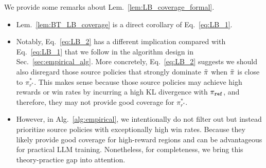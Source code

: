 \begin{remark}\label{remark:LB_coverage}
    We provide some remarks about Lem.~\ref{lem:LB_coverage_formal}.
    \begin{itemize}
        \item Lem.~\ref{lem:BT_LB_coverage} is a direct corollary of Eq.~\eqref{eq:LB_1}.

        \item Notably, Eq.~\eqref{eq:LB_2} has a different implication compared with Eq.~\eqref{eq:LB_1} that we follow in the algorithm design in Sec.~\ref{sec:empirical_alg}.
        More concretely, Eq.~\eqref{eq:LB_2} suggests we should also disregard those source policies that strongly dominate $\bar{\pi}$ when $\bar{\pi}$ is close to $\pi^*_{r^*}$.
        This makes sense because those source policies may achieve high rewards or win rates by incurring a high KL divergence with $\pi_{\texttt{ref}}$, and therefore, they may not provide good coverage for $\pi^*_{r^*}$.
    
        \item However, in Alg.~\ref{alg:empirical}, we intentionally do not filter out but instead prioritize source policies with exceptionally high win rates. 
        Because they likely provide good coverage for high-reward regions and can be advantageous for practical LLM training.
        Nonetheless, for completeness, we bring this theory-practice gap into attention.
    \end{itemize}
\end{remark}